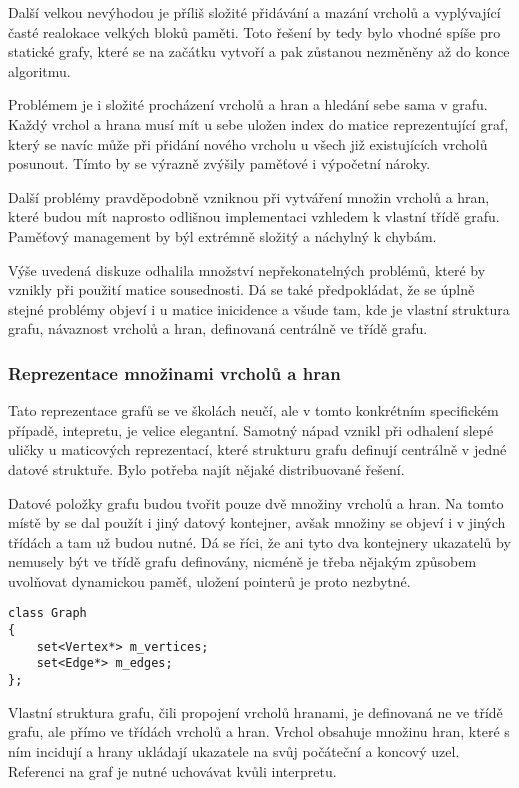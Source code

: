 \documentclass[11pt,twoside,a4paper]{book}
\begin{document}
Další velkou nevýhodou je příliš složité přidávání a mazání vrcholů a vyplývající časté realokace velkých bloků paměti. Toto řešení by tedy bylo vhodné spíše pro statické grafy, které se na začátku vytvoří a pak zůstanou nezměněny až do konce algoritmu.

Problémem je i složité procházení vrcholů a hran a hledání sebe sama v grafu. Každý vrchol a hrana musí mít u sebe uložen index do matice reprezentující graf, který se navíc může při přidání nového vrcholu u všech již existujících vrcholů posunout. Tímto by se výrazně zvýšily paměťové i výpočetní nároky.

Další problémy pravděpodobně vzniknou při vytváření množin vrcholů a hran, které budou mít naprosto odlišnou implementaci vzhledem k vlastní třídě grafu. Paměťový management by býl extrémně složitý a náchylný k chybám.

Výše uvedená diskuze odhalila množství nepřekonatelných problémů, které by vznikly při použití matice sousednosti. Dá se také předpokládat, že se úplně stejné problémy objeví i u matice inicidence a všude tam, kde je vlastní struktura grafu, návaznost vrcholů a hran, definovaná centrálně ve třídě grafu.


\subsubsection{Reprezentace množinami vrcholů a hran}
\label{reprezentace_mnozinami_vrcholu_a_hran}

Tato reprezentace grafů se ve školách neučí, ale v tomto konkrétním specifickém případě, intepretu, je velice elegantní. Samotný nápad vznikl při odhalení slepé uličky u maticových reprezentací, které strukturu grafu definují centrálně v jedné datové struktuře. Bylo potřeba najít nějaké distribuované řešení.

Datové položky grafu budou tvořit pouze dvě množiny vrcholů a hran. Na tomto místě by se dal použít i jiný datový kontejner, avšak množiny se objeví i v jiných třídách a tam už budou nutné. Dá se říci, že ani tyto dva kontejnery ukazatelů by nemusely být ve třídě grafu definovány, nicméně je třeba nějakým způsobem uvolňovat dynamickou paměť, uložení pointerů je proto nezbytné.

\begin{verbatim}
class Graph
{
    set<Vertex*> m_vertices;
    set<Edge*> m_edges;
};
\end{verbatim}

Vlastní struktura grafu, čili propojení vrcholů hranami, je definovaná ne ve třídě grafu, ale přímo ve třídách vrcholů a hran. Vrchol obsahuje množinu hran, které s ním incidují a hrany ukládají ukazatele na svůj počáteční a koncový uzel. Referenci na graf je nutné uchovávat kvůli interpretu.
\end{document}
